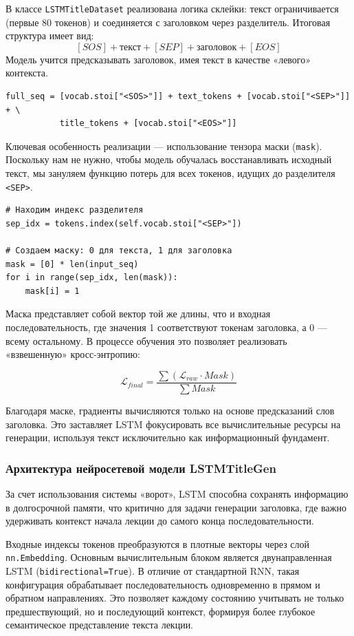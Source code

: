 \documentclass[coursework]{SCWorks}
\begin{document}
    В классе \texttt{LSTMTitleDataset} реализована логика склейки:
    текст ограничивается (первые 80 токенов) и соединяется с заголовком через разделитель.
    Итоговая структура имеет вид:
    \[[SOS] + \text{текст} + [SEP] + \text{заголовок} + [EOS]\]
    Модель учится предсказывать заголовок, имея текст в качестве «левого» контекста.

    \begin{verbatim}
full_seq = [vocab.stoi["<SOS>"]] + text_tokens + [vocab.stoi["<SEP>"]] + \
           title_tokens + [vocab.stoi["<EOS>"]]
    \end{verbatim}

    Ключевая особенность реализации — использование тензора маски (\texttt{mask}).
    Поскольку нам не нужно, чтобы модель обучалась восстанавливать исходный текст,
    мы зануляем функцию потерь для всех токенов, идущих до разделителя \texttt{<SEP>}.

    \begin{verbatim}
# Находим индекс разделителя
sep_idx = tokens.index(self.vocab.stoi["<SEP>"])

# Создаем маску: 0 для текста, 1 для заголовка
mask = [0] * len(input_seq)
for i in range(sep_idx, len(mask)):
    mask[i] = 1
    \end{verbatim}

    Маска представляет собой вектор той же длины, что и входная последовательность, где значения 1 соответствуют токенам заголовка,
    а 0 — всему остальному.
    В процессе обучения это позволяет реализовать «взвешенную» кросс-энтропию:

    \[\mathcal{L}_{final} = \frac{\sum (\mathcal{L}_{raw} \cdot Mask)}{\sum Mask}\]

    Благодаря маске, градиенты вычисляются только на основе предсказаний слов заголовка.
    Это заставляет LSTM фокусировать все вычислительные ресурсы на генерации, используя текст исключительно как информационный фундамент.

    \subsubsection{Архитектура нейросетевой модели LSTMTitleGen}

    За счет использования системы «ворот», LSTM способна сохранять информацию в долгосрочной памяти,
    что критично для задачи генерации заголовка, где важно удерживать контекст начала лекции до самого конца последовательности.

    Входные индексы токенов преобразуются в плотные векторы через слой \texttt{nn.Embedding}.
    Основным вычислительным блоком является двунаправленная LSTM (\texttt{bidirectional=True}).
    В отличие от стандартной RNN, такая конфигурация обрабатывает последовательность одновременно в прямом и обратном направлениях.
    Это позволяет каждому состоянию учитывать не только предшествующий, но и последующий контекст, формируя более
    глубокое семантическое представление текста лекции.
\end{document}
